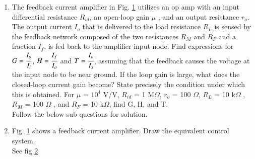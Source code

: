 \begin{enumerate}[label=\thesection.\arabic*.,ref=\thesection.\theenumi]

\item The feedback current amplifier in Fig. \ref{fig:ep18btech11016_circuit} utilizes an op amp with an input differential resistance $R_{id}$, an open-loop gain $\mu$ , and an output resistance $r_o$. The output current $I_o$ that is delivered to the load resistance $R_L$ is sensed by the feedback network composed of the two resistances $R_M$ and $R_F$ and a fraction $I_f$, is fed back to the amplifier input node. Find expressions for $G = \cfrac{I_o}{I_i}$, $H = \cfrac{I_f}{I_o}$ and $T = \cfrac{I_o}{I_s}$, assuming that the feedback causes the voltage at the input node to be near ground. If the loop gain is large, what does the closed-loop current gain become? State precisely the condition under which this is obtained. For $\mu$ = $10^4$ V/V, $R_{id}$ = 1 M$\Omega$, $r_o$ = 100 $\Omega$, $R_L$ = 10 k$\Omega$ , $R_M$ = 100 $\Omega$ , and $R_F$ = 10 k$\Omega$, find G, H, and T.
\\
\solution Follow the below sub-questions for solution.
\\


\item Fig. \ref{fig:ep18btech11016_circuit} shows a feedback current amplifier. Draw the equivalent control system.
\\
\solution See fig \ref{fig:ep18btech11016_block}
\\

\renewcommand{\thefigure}{\theenumi.\arabic{figure}}
\begin{figure}[!ht]
	\begin{center}
		\resizebox{\columnwidth}{!}{}
	\end{center}
\caption{}
\label{fig:ep18btech11016_circuit}
\end{figure}
%
\begin{figure}[!ht]
	\begin{center}
		\resizebox{\columnwidth}{!}{}
	\end{center}
\caption{}
\label{fig:ep18btech11016_block}
\end{figure}
\renewcommand{\thefigure}{\theenumi}



\end{enumerate}
